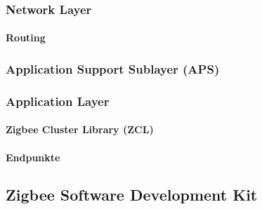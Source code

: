 \subsubsection{Network Layer}\label{subsubsec:Network Layer}

\paragraph{Routing}\label{par:Zigbee Routing}






\subsubsection{Application Support Sublayer (APS)}\label{subsubsec:ApplicationSupportSublayer}


\subsubsection{Application Layer}\label{subsubsec:ZigbeeApplicationLayer}

\paragraph{Zigbee Cluster Library (ZCL)}\label{par:ZigbeeClusterLibrary}

\paragraph{Endpunkte}\label{par:ZigbeeEndpunkte}





\subsection{Zigbee Software Development Kit}\label{subsec:ZigbeeSoftwareDevelopmentKit}
